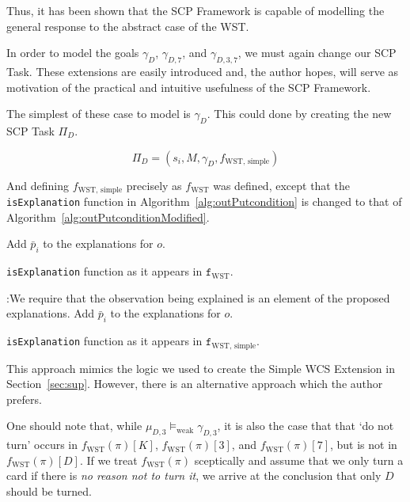 Thus, it has been shown that the SCP Framework is capable of modelling the general response to the abstract case of the WST.


In order to model the goals $\gamma_{D}$, $\gamma_{D,7}$, and $\gamma_{D,3,7}$, we must again change our SCP Task. These extensions are easily introduced and, the author hopes, will serve as motivation of the practical and intuitive usefulness of the SCP Framework.

The simplest of these case to model is  $\gamma_{D}$. This could done by creating the new SCP Task $\Pi_D$.

\[
\Pi_D = (s_i, M, \gamma_D, f_\text{WST, simple})
\]

And defining $f_\text{WST, simple}$ precisely as $f_\text{WST}$ was defined, except that the \texttt{isExplanation} function in Algorithm~\ref{alg:outPutcondition} is changed to that of 
Algorithm~\ref{alg:outPutconditionModified}.

\begin{algorithm}[H] 
\SetAlgoLined
{}
{
{
{
Add $\bar{p}_i$ to the explanations for $o$.
}
}
}
\caption{\texttt{isExplanation} function as it appears in $\texttt{f}_\text{WST}$.}
\label{alg:outPutcondition}
\end{algorithm}

\begin{algorithm}[H] 
\SetAlgoLined
{}
{
{
\tcc:{We require that the observation being explained is an element of the proposed explanations.}
{
Add $\bar{p}_i$ to the explanations for $o$.
}
}
}
\caption{\texttt{isExplanation} function as it appears in $\texttt{f}_\text{WST, simple}$.}
\label{alg:outPutconditionModified}
\end{algorithm}

This approach mimics the logic we used to create the Simple WCS Extension in Section~\ref{sec:sup}. However, there is an alternative approach which the author prefers. 

One should note that, while $\mu_{D,3}\models_\text{weak} \gamma_{D,3}$, it is also the case that that `do not turn' occurs in $f_\text{WST}(\pi)[K]$, $f_\text{WST}(\pi)[3]$, and $ f_\text{WST}(\pi)[7]$, but is not in $ f_\text{WST}(\pi)[D]$. If we treat $f_\text{WST}(\pi)$ sceptically and assume that we only turn a card if there is \textit{no reason not to turn it}, we arrive at the conclusion that only $D$ should be turned.

